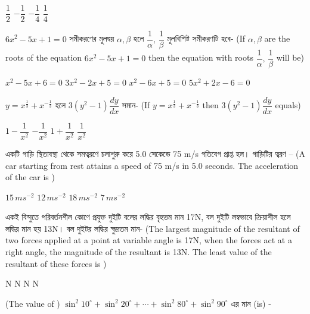\documentclass[addpoints]{exam}
\begin{document}
\begin{questions}
\begin{oneparchoices}
\choice $ \dfrac{1}{2}  $
\choice $ -\dfrac{1}{2}  $
\choice $ -\dfrac{1}{4}  $
\choice $ \dfrac{1}{4} $
\end{oneparchoices}

\question $ 6x^{2}-5x+1=0 $ সমীকরণের মূলদ্বয় $ \alpha, \beta $ হলে $ \dfrac{1}{\alpha},\,\dfrac{1}{\beta} $ মূলবিশিষ্ট সমীকরণটি হবে- (If $ \alpha, \beta $ are the roots of the equation $ 6x^{2}-5x+1=0 $ then the equation with roots $ \dfrac{1}{\alpha},\,\dfrac{1}{\beta} $ will be)

\begin{oneparchoices}
\choice $ x^{2}-5x+6=0 $
\choice $ 3x^{2}-2x+5=0 $
\choice $ x^{2}-6x+5=0 $
\choice $ 5x^{2}+2x-6=0 $
\end{oneparchoices}

\question $ y= x^{\frac{1}{3}} + x^{-\frac{1}{3}}$ হলে $ 3(y^{2}-1)\dfrac{dy}{dx} $ সমান- (If $ y= x^{\frac{1}{3}} + x^{-\frac{1}{3}}$ then  $ 3(y^{2}-1)\dfrac{dy}{dx} $ equals)

\begin{oneparchoices}
\choice $ 1-\dfrac{1}{x^{2}} $ 
\choice $ -\dfrac{1}{x^{2}} $ 
\choice  $ 1+\dfrac{1}{x^{2}} $
\choice $ \dfrac{1}{x^{2}} $
\end{oneparchoices}

\question  একটি গাড়ি স্থিতাবস্থা থেকে সমত্বরণে চলাশুরু করে 5.0 সেকেন্ডে 75 m/s গতিবেগ প্রাপ্ত হল। গাড়িটির ত্বরণ – (A car starting from rest attains a speed of 75 m/s in 5.0 seconds. The acceleration of the car is )

\begin{oneparchoices}
\choice $ 15\,ms^{-2} $
\choice $ 12\,ms^{-2} $
\choice $ 18\,ms^{-2} $
\choice $ 7\,ms^{-2} $
\end{oneparchoices}

\question একই বিন্দুতে পরিবর্তনশীল কোণে প্রযুক্ত দুইটি বলের লদ্ধির বৃহত্তম মান 17N, বল দুইটি লম্বভাবে ক্রিয়াশীল হলে লদ্ধির মান হয় 13N। বল দুইটর লদ্ধির ক্ষুদ্রতম মান- (The largest magnitude of the resultant of two forces applied at a point at variable angle is 17N, when the forces act at a right angle, the magnitude of the resultant is 13N. The least value of the resultant of these forces is )

\begin{oneparchoices}
 N
 N
 N
 N
\end{oneparchoices}

\question (The value of ) $ \sin^{2} 10^{\circ}+\sin^{2} 20^{\circ}+\cdots + \sin^{2} 80^{\circ}+\sin^{2} 90^{\circ} $ এর মান (is) -



\end{questions}
\end{document}
